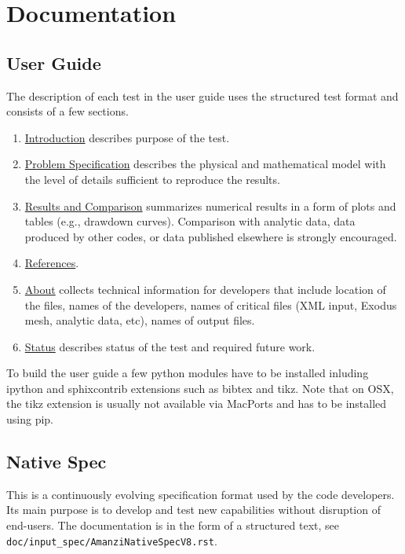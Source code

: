 %
%

\section{Documentation}

\subsection{User Guide}
The description of each test in the user guide uses the structured test format
and consists of a few sections.

\begin{enumerate}
\item \underline{Introduction} describes purpose of the test.
\item \underline{Problem Specification} describes the physical and mathematical model 
      with the level of details sufficient to reproduce the results.
\item \underline{Results and Comparison} summarizes numerical results in a form of plots
      and tables (e.g., drawdown curves). Comparison with analytic data, data produced 
      by other codes, or data published elsewhere is strongly encouraged.
\item \underline{References}.
\item \underline{About} collects technical information for developers that include 
      location of the files, names of the developers, names of critical files (XML input,
      Exodus mesh, analytic data, etc), names of output files.
\item \underline{Status} describes status of the test and required future work.
\end{enumerate}

To build the user guide a few python modules have to be installed inluding ipython and
sphixcontrib extensions such as bibtex and tikz. 
Note that on OSX, the tikz extension is usually not available via MacPorts and has to
be installed using pip.



\subsection{Native Spec}
This is a continuously evolving specification format used by the code developers. 
Its main purpose is to develop and test new capabilities without disruption of end-users.
The documentation is in the form of a structured text, see {\tt doc/input\_spec/AmanziNativeSpecV8.rst}.



